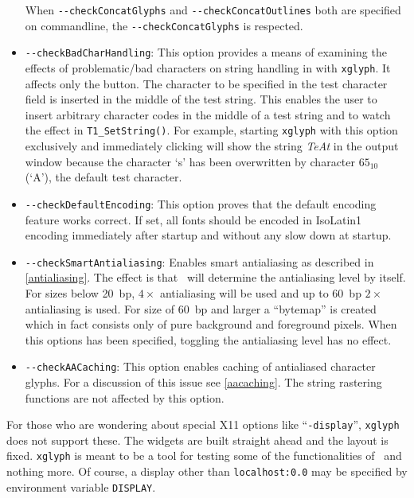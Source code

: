\begin{itemize}
  When \verb+--checkConcatGlyphs+ and \verb+--checkConcatOutlines+ both are
  specified on commandline, the \verb+--checkConcatGlyphs+ is respected.
\item\verb+--checkBadCharHandling+: This option provides a means of
  examining the effects of problematic/bad characters on string handling in
  \tonelib with \verb+xglyph+. It affects only the  button.
  The character to be specified in the test character field is inserted in
  the middle of the test string. This enables the user to insert arbitrary
  character codes in the middle of a test string and to watch the effect in
  \verb+T1_SetString()+. For example, starting \verb+xglyph+ with this
  option exclusively and immediately clicking  will show
  the string {\em TeAt} in the output window because the character `s' has
  been overwritten by character $65_{10}$ (`A'), the default test character.
\item\verb+--checkDefaultEncoding+: This option proves that the default
  encoding feature works correct. If set, all fonts should be encoded in
  IsoLatin1 encoding immediately after startup and without any slow down at
  startup. 
\item\verb+--checkSmartAntialiasing+: Enables smart antialiasing as described
  in \ref{antialiasing}. The effect is that \tonelib\ will determine the
  antialiasing level by itself.  For sizes below 20~bp, $4\times$ antialiasing
  will be used and up to 60~bp $2\times$ antialiasing is used. For size of
  60~bp and larger a ``bytemap'' is created which in fact consists only of
  pure background and foreground pixels. When this options has been
  specified, toggling the antialiasing level has no effect.
\item\verb+--checkAACaching+: This option enables caching of antialiased
  character glyphs. For a discussion of this issue see \ref{aacaching}. The
  string rastering functions are not affected by this option.
\end{itemize}
For those who are wondering about special X11 options like ``\verb+-display+'',
\verb+xglyph+ does not support these. The widgets are built straight ahead and
the layout is fixed. \verb+xglyph+ is meant to be a tool for testing some of
the functionalities of \tonelib\ and nothing more. Of course, a display other
than \verb+localhost:0.0+ may be specified by environment variable
\verb+DISPLAY+. 


